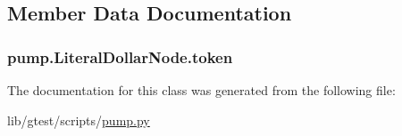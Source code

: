 \subsection{Member Data Documentation}
\hypertarget{classpump_1_1_literal_dollar_node_ab4c6e209635b8868bcdf0fe8053431c6}{
\subsubsection[{token}]{\setlength{\rightskip}{0pt plus 5cm}pump.\-Literal\-Dollar\-Node.\-token}}\label{classpump_1_1_literal_dollar_node_ab4c6e209635b8868bcdf0fe8053431c6}


The documentation for this class was generated from the following file\-:\begin{DoxyCompactItemize}
\item 
lib/gtest/scripts/\hyperlink{pump_8py}{pump.\-py}\end{DoxyCompactItemize}
